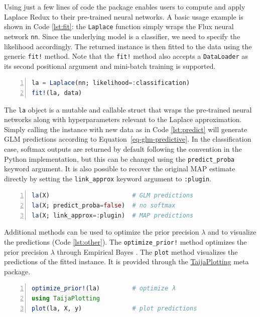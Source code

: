 \documentclass{juliacon}
\begin{document}
Using just a few lines of code the package enables users to compute and
apply Laplace Redux to their pre-trained neural networks. A basic usage
example is shown in Code \ref{lst:fit}: the \texttt{Laplace} function
simply wraps the Flux neural network \texttt{nn}. Since the underlying
model is a classifier, we need to specify the likelihood accordingly.
The returned instance is then fitted to the data using the generic
\texttt{fit!} method. Note that the \texttt{fit!} method also accepts a
\texttt{DataLoader} as its second positional argument and mini-batch
training is supported.

\begin{lstlisting}[language=Julia, escapechar=@, numbers=left, label={lst:fit}, caption={Fitting a pre-trained neural network to data using Laplace Redux.}]
la = Laplace(nn; likelihood=:classification)
fit!(la, data)
\end{lstlisting}

The \texttt{la} object is a mutable and callable struct that wraps the
pre-trained neural networks along with hyperparameters relevant to the
Laplace approximation. Simply calling the instance with new data as in
Code \ref{lst:predict} will generate GLM predictions according to
Equation~\ref{eq-glm-predictive}. In the classification case, softmax
outputs are returned by default following the convention in the Python
implementation, but this can be changed using the
\texttt{predict\_proba} keyword argument. It is also possible to recover
the original MAP estimate directly by setting the \texttt{link\_approx}
keyword argument to \texttt{:plugin}.

\begin{lstlisting}[language=Julia, escapechar=@, numbers=left, label={lst:predict}, caption={Predictions using the fitted Laplace Redux instance.}]
la(X)                       # GLM predictions
la(X; predict_proba=false)  # no softmax
la(X; link_approx=:plugin)  # MAP predictions
\end{lstlisting}

Additional methods can be used to optimize the prior precision
\(\lambda\) and to visualize the predictions (Code \ref{lst:other}). The
\texttt{optimize\_prior!} method optimizes the prior precision
\(\lambda\) through Empirical Bayes \cite{daxberger2021laplace}. The
\texttt{plot} method visualizes the predictions of the fitted instance.
It is provided through the
\href{https://github.com/JuliaTrustworthyAI/TaijaPlotting.jl}{TaijaPlotting}
meta package.

\begin{lstlisting}[language=Julia, escapechar=@, numbers=left, label={lst:other}, caption={Prior optimization and visualization of the predictive distribution.}]
optimize_prior!(la)         # optimize λ
using TaijaPlotting
plot(la, X, y)              # plot predictions
\end{lstlisting}
\end{document}
